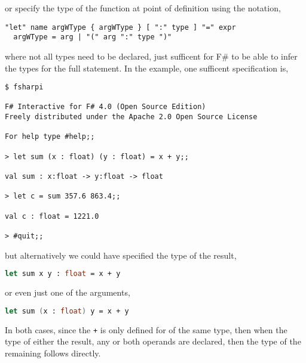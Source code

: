 or specify the type of the function at point of definition using the notation,
\begin{lstlisting}[language=ebnf]
  "let" name argWType { argWType } [ ":" type ] "=" expr
  argWType = arg | "(" arg ":" type ")"
\end{lstlisting}
where not all types need to be declared, just sufficent for F\# to be able to infer the types for the full statement. In the example, one sufficent specification is,
\begin{lstlisting}[language=console]
$ fsharpi

F# Interactive for F# 4.0 (Open Source Edition)
Freely distributed under the Apache 2.0 Open Source License

For help type #help;;

> let sum (x : float) (y : float) = x + y;;

val sum : x:float -> y:float -> float

> let c = sum 357.6 863.4;;

val c : float = 1221.0

> #quit;;
\end{lstlisting}
but alternatively we could have specified the type of the result,
\begin{lstlisting}[language=FSharp]
  let sum x y : float = x + y
\end{lstlisting}
or even just one of the arguments,
\begin{lstlisting}[language=FSharp]
  let sum (x : float) y = x + y
\end{lstlisting}
In both cases, since the \lstinline|+|  is only defined for  of the same type, then when the type of either the result, any or both operands are declared, then the type of the remaining follows directly.

